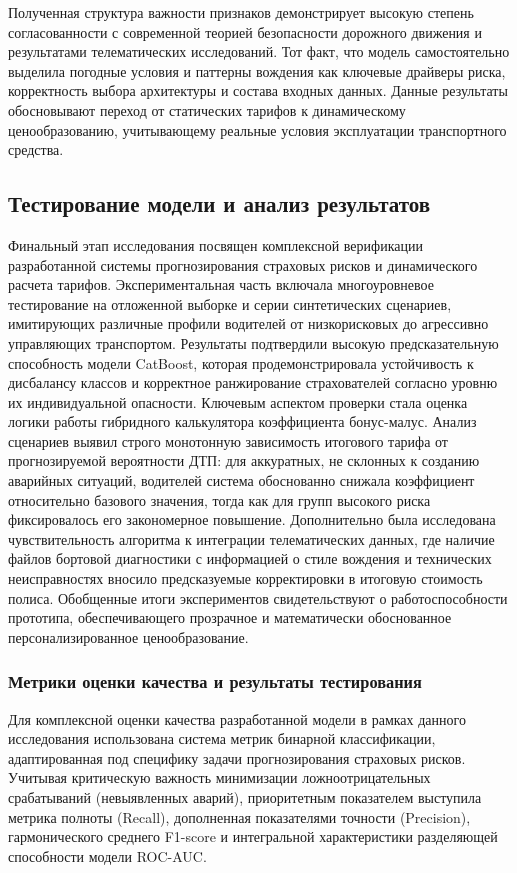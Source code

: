 Полученная структура важности признаков демонстрирует высокую степень согласованности с современной теорией безопасности дорожного движения и результатами телематических исследований. Тот факт, что модель самостоятельно выделила погодные условия и паттерны вождения как ключевые драйверы риска, корректность выбора архитектуры и состава входных данных. Данные результаты обосновывают переход от статических тарифов к динамическому ценообразованию, учитывающему реальные условия эксплуатации транспортного средства.

\subsection{Тестирование модели и анализ результатов}

Финальный этап исследования посвящен комплексной верификации разработанной системы прогнозирования страховых рисков и динамического расчета тарифов. Экспериментальная часть включала многоуровневое тестирование на отложенной выборке и серии синтетических сценариев, имитирующих различные профили водителей от низкорисковых до агрессивно управляющих транспортом. Результаты подтвердили высокую предсказательную способность модели CatBoost, которая продемонстрировала устойчивость к дисбалансу классов и корректное ранжирование страхователей согласно уровню их индивидуальной опасности.
Ключевым аспектом проверки стала оценка логики работы гибридного калькулятора коэффициента бонус-малус. Анализ сценариев выявил строго монотонную зависимость итогового тарифа от прогнозируемой вероятности ДТП: для аккуратных, не склонных к созданию аварийных ситуаций, водителей система обоснованно снижала коэффициент относительно базового значения, тогда как для групп высокого риска фиксировалось его закономерное повышение. Дополнительно была исследована чувствительность алгоритма к интеграции телематических данных, где наличие файлов бортовой диагностики с информацией о стиле вождения и технических неисправностях вносило предсказуемые корректировки в итоговую стоимость полиса. Обобщенные итоги экспериментов свидетельствуют о работоспособности прототипа, обеспечивающего прозрачное и математически обоснованное персонализированное ценообразование.

\subsubsection{Метрики оценки качества и результаты тестирования}

Для комплексной оценки качества разработанной модели в рамках данного исследования использована система метрик бинарной классификации, адаптированная под специфику задачи прогнозирования страховых рисков. Учитывая критическую важность минимизации ложноотрицательных срабатываний (невыявленных аварий), приоритетным показателем выступила метрика полноты (Recall), дополненная показателями точности (Precision), гармонического среднего F1-score и интегральной характеристики разделяющей способности модели ROC-AUC.

